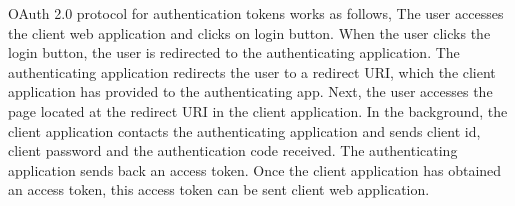 \documentclass[11pt, pdftex, conference]{IEEEtran}
\begin{document}
\hspace{10mm}OAuth 2.0 protocol for authentication tokens\cite{4} works as follows,
The user accesses the client web application and clicks on login button. When the user clicks the login button, the user is redirected to the authenticating application. The authenticating application redirects the user to a redirect URI, which the client application has provided to the authenticating app. Next, the user accesses the page located at the redirect URI in the client application. In the background, the client application contacts the authenticating application and sends client id, client password and the authentication code received. The authenticating application sends back an access token.
Once the client application has obtained an access token, this access token can be sent client web application. \linebreak
\end{document}
